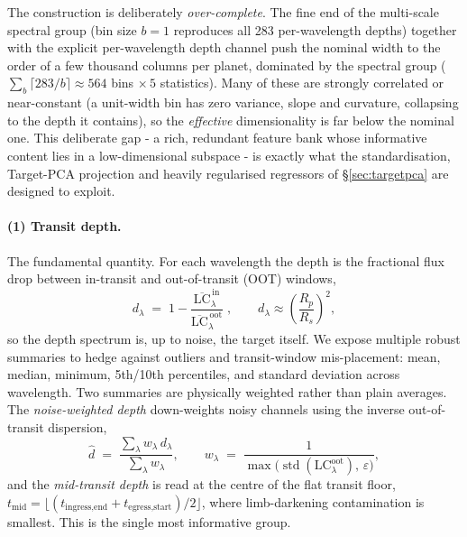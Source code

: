 \documentclass[12pt]{article}
\begin{document}
The construction is deliberately \emph{over-complete}. The fine end of the multi-scale spectral group (bin size $b{=}1$ reproduces all 283 per-wavelength depths) together with the explicit per-wavelength depth channel push the nominal width to the order of a few thousand columns per planet, dominated by the spectral group ($\sum_b \lceil 283/b\rceil \approx 564$ bins $\times\,5$ statistics). Many of these are strongly correlated or near-constant (a unit-width bin has zero variance, slope and curvature, collapsing to the depth it contains), so the \emph{effective} dimensionality is far below the nominal one. This deliberate gap - a rich, redundant feature bank whose informative content lies in a low-dimensional subspace - is exactly what the standardisation, Target-PCA projection and heavily regularised regressors of \S\ref{sec:targetpca} are designed to exploit.

\paragraph{(1) Transit depth.} The fundamental quantity. For each wavelength the depth is the fractional flux drop between in-transit and out-of-transit (OOT) windows,
\[
d_\lambda \;=\; 1 - \frac{\overline{\mathrm{LC}}^{\,\text{in}}_\lambda}{\overline{\mathrm{LC}}^{\,\text{oot}}_\lambda}\;,\qquad d_\lambda \approx \left(\frac{R_p}{R_s}\right)^2,
\]
so the depth spectrum is, up to noise, the target itself. We expose multiple robust summaries to hedge against outliers and transit-window mis-placement: mean, median, minimum, 5th/10th percentiles, and standard deviation across wavelength. Two summaries are physically weighted rather than plain averages. The \emph{noise-weighted depth} down-weights noisy channels using the inverse out-of-transit dispersion,
\[
\hat d \;=\; \frac{\sum_\lambda w_\lambda\, d_\lambda}{\sum_\lambda w_\lambda},\qquad
w_\lambda \;=\; \frac{1}{\max\!\big(\operatorname{std}(\mathrm{LC}^{\text{oot}}_\lambda),\,\varepsilon\big)},
\]
and the \emph{mid-transit depth} is read at the centre of the flat transit floor, $t_{\text{mid}} = \lfloor(t_{\text{ingress,end}} + t_{\text{egress,start}})/2\rfloor$, where limb-darkening contamination is smallest. This is the single most informative group.
\end{document}
